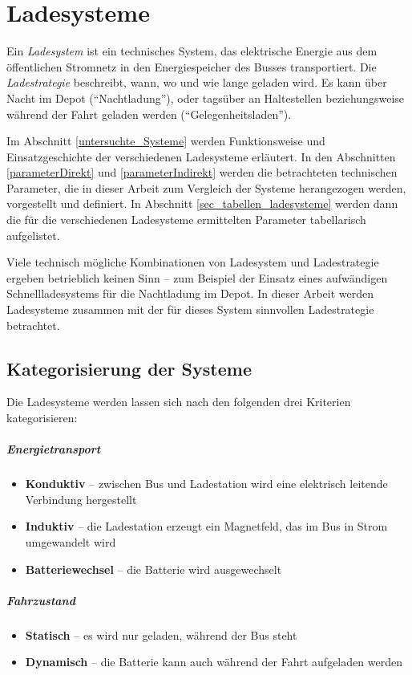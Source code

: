 \chapter{Ladesysteme}
Ein \emph{Ladesystem} ist ein technisches System, das elektrische Energie aus dem öffentlichen Stromnetz in den Energiespeicher des Busses transportiert. Die \emph{Ladestrategie} beschreibt, wann, wo und wie lange geladen wird. Es kann über Nacht im Depot ("`Nachtladung"'), oder tagsüber an Haltestellen beziehungsweise während der Fahrt geladen werden ("`Gelegenheitsladen"').

Im  Abschnitt \ref{untersuchte_Systeme} werden Funktionsweise und Einsatzgeschichte der verschiedenen Ladesysteme erläutert. In den Abschnitten \ref{parameterDirekt} und \ref{parameterIndirekt} werden die betrachteten technischen Parameter, die in dieser Arbeit zum Vergleich der Systeme herangezogen werden, vorgestellt und definiert. In Abschnitt \ref{sec_tabellen_ladesysteme} werden dann die für die verschiedenen Ladesysteme ermittelten Parameter tabellarisch aufgelistet. 

Viele technisch mögliche Kombinationen von Ladesystem und Ladestrategie ergeben betrieblich keinen Sinn – zum Beispiel der Einsatz eines aufwändigen Schnellladesystems für die Nachtladung im Depot. In dieser Arbeit werden Ladesysteme zusammen mit der für dieses System sinnvollen Ladestrategie betrachtet.

\section{Kategorisierung der Systeme}
Die Ladesysteme werden lassen sich nach den folgenden drei Kriterien kategorisieren:

\paragraph{Energietransport}
\begin{itemize}
	\item \textbf{Konduktiv} – zwischen Bus und Ladestation wird eine elektrisch leitende Verbindung hergestellt
	\item \textbf{Induktiv} – die Ladestation erzeugt ein Magnetfeld, das im Bus in Strom umgewandelt wird
	\item \textbf{Batteriewechsel} – die Batterie wird ausgewechselt
\end{itemize}

\paragraph{Fahrzustand}
\begin{itemize}
	\item \textbf{Statisch} – es wird nur geladen, während der Bus steht
	\item \textbf{Dynamisch} – die Batterie kann auch während der Fahrt aufgeladen werden
\end{itemize}


